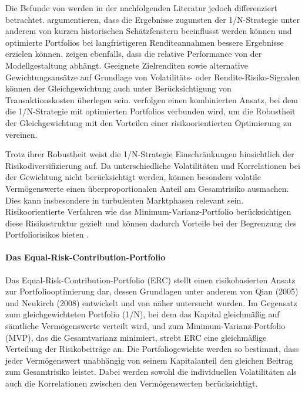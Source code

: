 \documentclass[a4paper, 12pt]{article}
\begin{document}
Die Befunde von \textcite{demiguel2009} werden in der nachfolgenden Literatur jedoch differenziert betrachtet.
\textcite{kritzman2010} argumentieren, dass die Ergebnisse zugunsten der 1/N-Strategie unter anderem von kurzen historischen Schätzfenstern beeinflusst werden können und optimierte Portfolios bei langfristigeren Renditeannahmen bessere Ergebnisse erzielen können.
\textcite{kirby2012} zeigen ebenfalls, dass die relative Performance von der Modellgestaltung abhängt.
Geeignete Zielrenditen sowie alternative Gewichtungsansätze auf Grundlage von Volatilitäts- oder Rendite-Risiko-Signalen können der Gleichgewichtung auch unter Berücksichtigung von Transaktionskosten überlegen sein.
\textcite{tu2011} verfolgen einen kombinierten Ansatz, bei dem die 1/N-Strategie mit optimierten Portfolios verbunden wird, um die Robustheit der Gleichgewichtung mit den Vorteilen einer risikoorientierten Optimierung zu vereinen.

Trotz ihrer Robustheit weist die 1/N-Strategie Einschränkungen hinsichtlich der Risikodiversifizierung auf.
Da unterschiedliche Volatilitäten und Korrelationen bei der Gewichtung nicht berücksichtigt werden, können besonders volatile Vermögenswerte einen überproportionalen Anteil am Gesamtrisiko ausmachen.
Dies kann insbesondere in turbulenten Marktphasen relevant sein.
Risikoorientierte Verfahren wie das Minimum-Varianz-Portfolio berücksichtigen diese Risikostruktur gezielt und können dadurch Vorteile bei der Begrenzung des Portfoliorisikos bieten \parencite[vgl.][S.~165]{savona2019}.

\paragraph{Das Equal-Risk-Contribution-Portfolio}
Das Equal-Risk-Contribution-Portfolio (ERC) stellt einen risikobasierten Ansatz zur Portfoliooptimierung dar, dessen Grundlagen unter anderem von Qian (2005) und Neukirch (2008) entwickelt und von \textcite{maillard2010} näher untersucht wurden.
Im Gegensatz zum gleichgewichteten Portfolio (1/N), bei dem das Kapital gleichmäßig auf sämtliche Vermögenswerte verteilt wird, und zum Minimum-Varianz-Portfolio (MVP), das die Gesamtvarianz minimiert, strebt ERC eine gleichmäßige Verteilung der Risikobeiträge an.
Die Portfoliogewichte werden so bestimmt, dass jeder Vermögenswert unabhängig von seinem Kapitalanteil den gleichen Beitrag zum Gesamtrisiko leistet.
Dabei werden sowohl die individuellen Volatilitäten als auch die Korrelationen zwischen den Vermögenswerten berücksichtigt.
\end{document}
